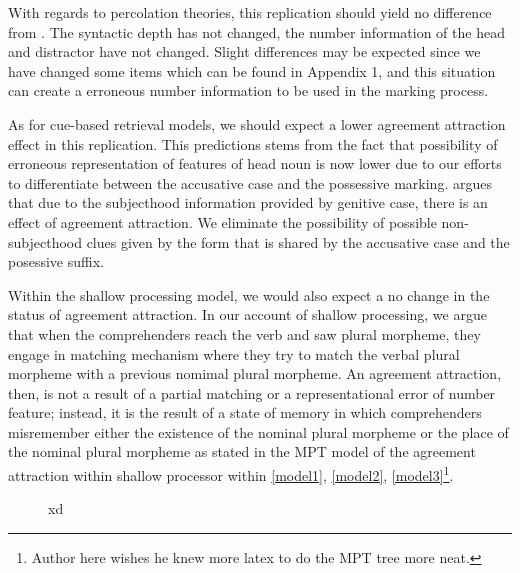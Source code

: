 \documentclass[doc]{apa6}
\let\rmarkdownfootnote\footnote%
\def\footnote{\protect\rmarkdownfootnote}
\begin{document}
With regards to percolation theories, this replication should yield no difference from \textcite{Lago2018}. The syntactic depth has not changed, the number information of the head and distractor have not changed. Slight differences may be expected since we have changed some items which can be found in Appendix 1, and this situation can create a erroneous number information to be used in the marking process.

As for cue-based retrieval models, we should expect a lower agreement attraction effect in this replication. This predictions stems from the fact that possibility of erroneous representation of features of head noun is now lower due to our efforts to differentiate between the accusative case and the possessive marking. \textcite{Lago2018} argues that due to the subjecthood information provided by genitive case, there is an effect of agreement attraction. We eliminate the possibility of possible non-subjecthood clues given by the form that is shared by the accusative case and the posessive suffix.

Within the shallow processing model, we would also expect a no change in the status of agreement attraction. In our account of shallow processing, we argue that when the comprehenders reach the verb and saw plural morpheme, they engage in matching mechanism where they try to match the verbal plural morpheme with a previous nomimal plural morpheme. An agreement attraction, then, is not a result of a partial matching or a representational error of number feature; instead, it is the result of a state of memory in which comprehenders misremember either the existence of the nominal plural morpheme or the place of the nominal plural morpheme as stated in the MPT model of the agreement attraction within shallow processor within \autoref{model1}, \autoref{model2}, \autoref{model3}\footnote{Author here wishes he knew more latex to do the MPT tree more neat.}.

\begin{figure}[htb!]
\centering
{}
\caption{xd}
\label{model1}
\end{figure}
\end{document}
